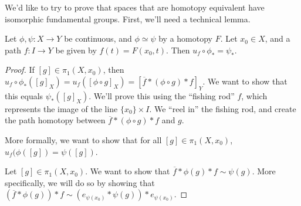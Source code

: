 We'd like to try to prove that spaces that are homotopy equivalent have isomorphic fundamental groups. First, we'll need a technical lemma. 
\begin{lemma}
	 Let $\phi, \psi : X \to Y$ be continuous, and $\phi\simeq \psi$ by a homotopy $F$. Let $x_0 \in X$, and a path $f:I \to Y$ be given by $f(t) = F(x_0,t)$. Then $u_f \circ \phi_\ast = \psi_\ast$. 
\end{lemma}
\begin{proof}
	If $[g]\in \pi_1 (X,x_0)$, then $u_f \circ \phi_\ast \left( [g]_X\right) = u_f ( [\phi \circ g]_X) = [\overline{f} \ast (\phi \circ g) \ast f ]_Y$. We want to show that this equals $\psi_\ast ([g]_X)$. We'll prove this using the ``fishing rod'' $f$, which represents the image of the line $\{x_0\} \times I$. We ``reel in'' the fishing rod, and create the path homotopy between $\overline{f} \ast (\phi \circ g) \ast f$ and $g$. 
	
	More formally, we want to show that for all $[g]\in\pi_1(X,x_0)$, $u_f(\phi([g])=\psi([g])$.
	
	Let $[g]\in\pi_1(X,x_0)$. We want to show that $\overline{f}*\phi(g)*f\sim \psi(g)$. More specifically, we will do so by showing that $\left(\overline{f}*\phi(g)\right)*f\sim \left( e_{\psi(x_0)}*\psi(g)\right)*e_{\psi(x_0)}$.
	

\end{proof}
